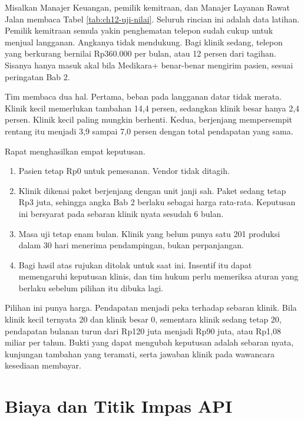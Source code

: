 \begin{kasus}[title={Kasus Medikara Health: Mengapa Klinik Mau Membayar Rp3 Juta?}]
Misalkan Manajer Keuangan, pemilik kemitraan, dan Manajer Layanan Rawat Jalan membaca Tabel \ref{tab:ch12-uji-nilai}. Seluruh rincian ini
adalah data latihan. Pemilik kemitraan semula yakin penghematan telepon sudah cukup untuk menjual langganan. Angkanya tidak mendukung.
Bagi klinik sedang, telepon yang berkurang bernilai Rp360.000 per bulan, atau 12 persen dari tagihan. Sisanya hanya masuk akal bila
Medikara+ benar-benar mengirim pasien, sesuai peringatan Bab 2.

Tim membaca dua hal. Pertama, beban pada langganan datar tidak merata. Klinik kecil memerlukan tambahan 14,4 persen, sedangkan klinik
besar hanya 2,4 persen. Klinik kecil paling mungkin berhenti. Kedua, berjenjang mempersempit rentang itu menjadi 3,9 sampai 7,0
persen dengan total pendapatan yang sama.

Rapat menghasilkan empat keputusan.
\begin{enumerate}
  \item Pasien tetap Rp0 untuk pemesanan. Vendor tidak ditagih.
  \item Klinik dikenai paket berjenjang dengan unit janji sah. Paket sedang tetap Rp3 juta, sehingga angka Bab 2 berlaku sebagai harga
        rata-rata. Keputusan ini bersyarat pada sebaran klinik nyata sesudah 6 bulan.
  \item Masa uji tetap enam bulan. Klinik yang belum punya satu 201 produksi dalam 30 hari menerima pendampingan, bukan perpanjangan.
  \item Bagi hasil atas rujukan ditolak untuk saat ini. Insentif itu dapat memengaruhi keputusan klinis, dan tim hukum perlu memeriksa
        aturan yang berlaku sebelum pilihan itu dibuka lagi.
\end{enumerate}

Pilihan ini punya harga. Pendapatan menjadi peka terhadap sebaran klinik. Bila klinik kecil ternyata 20 dan klinik besar 0, sementara
klinik sedang tetap 20, pendapatan bulanan turun dari Rp120 juta menjadi Rp90 juta, atau Rp1,08 miliar per tahun. Bukti yang dapat mengubah
keputusan adalah sebaran nyata, kunjungan tambahan yang teramati, serta jawaban klinik pada wawancara kesediaan membayar.
\end{kasus}

\section{Biaya dan Titik Impas API}

